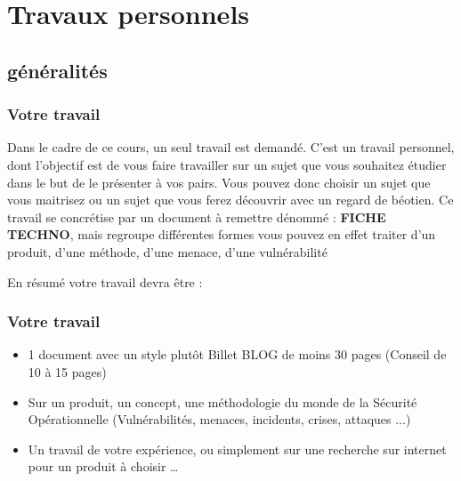 %                            
%

\section{Travaux personnels}

\subsection{généralités}




\begin{frame}
\frametitle<presentation>{Votre travail}
Dans le cadre de ce cours, un seul travail  est demandé. C'est un travail personnel, dont l'objectif est de vous faire travailler sur un sujet que vous souhaitez étudier dans le but de le présenter à vos pairs. Vous pouvez donc choisir un sujet que vous maitrisez ou un sujet que vous ferez découvrir avec un regard de béotien.
Ce travail se concrétise par un document à remettre dénommé : \textbf{FICHE TECHNO}, mais regroupe différentes formes vous pouvez en effet traiter d'un produit, d'une méthode, d'une menace, d'une vulnérabilité 
\end{frame}

En résumé votre travail devra être : 

\begin{frame}
\frametitle<presentation>{Votre travail}
\begin{itemize}
  \item  1 document avec un style plutôt Billet BLOG de moins 30 pages (Conseil de 10 à 15 pages)
  \item  Sur un produit, un concept, une méthodologie du monde de la Sécurité Opérationnelle (Vulnérabilités, menaces, incidents, crises, attaques ...)
  \item  Un travail de votre expérience, ou simplement sur une recherche sur internet pour un produit à choisir … 
\end{itemize}


\end{frame}

